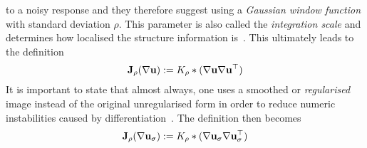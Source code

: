 to a noisy response and they therefore suggest using a \textit{Gaussian window function} with standard
deviation $\rho$. This parameter is also
called the \textit{integration scale} and determines how localised the structure information
is~\cite{ipcv}.
This ultimately leads to the definition
\begin{equation}
    \mathbf{J}_\rho(\mathbf{\nabla} \mathbf{u}) := K_\rho * (\mathbf{\nabla} \mathbf{u}\mathbf{\nabla} \mathbf{u}^\top)
\end{equation}
It is important to state that almost always, one uses a smoothed or \textit{regularised} image instead of the
original unregularised form in order to reduce numeric instabilities caused by
differentiation~\cite{ipcv}. The definition then becomes
\begin{equation}
    \mathbf{J}_\rho(\mathbf{\nabla} \mathbf{u}_\sigma) := K_\rho * (\mathbf{\nabla} \mathbf{u}_\sigma\mathbf{\nabla}
    \mathbf{u}_\sigma^\top)\label{def:StructTensor}
\end{equation}
